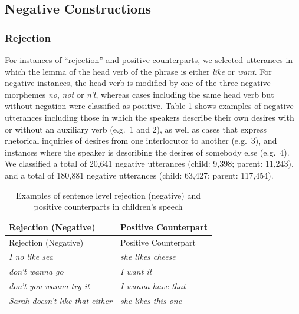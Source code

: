 \documentclass[
  english,
  man,floatsintext]{apa6}
\begin{document}
\hypertarget{negative-constructions}{%
\subsection{Negative Constructions}\label{negative-constructions}}

\hypertarget{rejection}{%
\subsubsection{Rejection}\label{rejection}}

For instances of ``rejection'' and positive counterparts, we selected utterances in which the lemma of the head verb of the phrase is either \emph{like} or \emph{want}. For negative instances, the head verb is modified by one of the three negative morphemes \emph{no}, \emph{not} or \emph{n't}, whereas cases including the same head verb but without negation were classified as positive. Table \ref{tab:rejection} shows examples of negative utterances including those in which the speakers describe their own desires with or without an auxiliary verb (e.g.~1 and 2), as well as cases that express rhetorical inquiries of desires from one interlocutor to another (e.g.~3), and instances where the speaker is describing the desires of somebody else (e.g.~4). We classified a total of 20,641 negative utterances (child: 9,398; parent: 11,243), and a total of 180,881 negative utterances (child: 63,427; parent: 117,454).

\begin{longtable}[]{@{}ll@{}}
\caption{\label{tab:rejection} Examples of sentence level rejection (negative) and positive counterparts in children's speech}\tabularnewline
\toprule
Rejection (Negative) & Positive Counterpart \\
\midrule
\endfirsthead
\toprule
Rejection (Negative) & Positive Counterpart \\
\midrule
\endhead
\emph{I no like sea} & \emph{she likes cheese} \\
\emph{don't wanna go} & \emph{I want it} \\
\emph{don't you wanna try it} & \emph{I wanna have that} \\
\emph{Sarah doesn't like that either} & \emph{she likes this one} \\
\bottomrule
\end{longtable}
\end{document}
